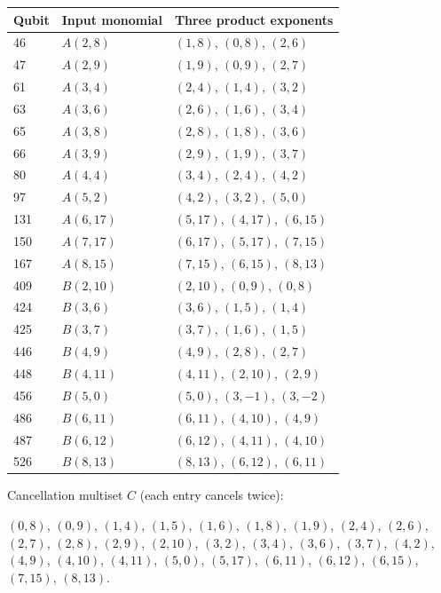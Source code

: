 \documentclass{article}
\begin{document}
\begin{center}
\begin{tabular}{lll}
  Qubit & Input monomial & Three product exponents \\
  \hline
  46 & \(A(2, 8)\) & \((1, 8)\), \((0, 8)\), \((2, 6)\) \\
  47 & \(A(2, 9)\) & \((1, 9)\), \((0, 9)\), \((2, 7)\) \\
  61 & \(A(3, 4)\) & \((2, 4)\), \((1, 4)\), \((3, 2)\) \\
  63 & \(A(3, 6)\) & \((2, 6)\), \((1, 6)\), \((3, 4)\) \\
  65 & \(A(3, 8)\) & \((2, 8)\), \((1, 8)\), \((3, 6)\) \\
  66 & \(A(3, 9)\) & \((2, 9)\), \((1, 9)\), \((3, 7)\) \\
  80 & \(A(4, 4)\) & \((3, 4)\), \((2, 4)\), \((4, 2)\) \\
  97 & \(A(5, 2)\) & \((4, 2)\), \((3, 2)\), \((5, 0)\) \\
  131 & \(A(6, 17)\) & \((5, 17)\), \((4, 17)\), \((6, 15)\) \\
  150 & \(A(7, 17)\) & \((6, 17)\), \((5, 17)\), \((7, 15)\) \\
  167 & \(A(8, 15)\) & \((7, 15)\), \((6, 15)\), \((8, 13)\) \\
  409 & \(B(2, 10)\) & \((2, 10)\), \((0, 9)\), \((0, 8)\) \\
  424 & \(B(3, 6)\) & \((3, 6)\), \((1, 5)\), \((1, 4)\) \\
  425 & \(B(3, 7)\) & \((3, 7)\), \((1, 6)\), \((1, 5)\) \\
  446 & \(B(4, 9)\) & \((4, 9)\), \((2, 8)\), \((2, 7)\) \\
  448 & \(B(4, 11)\) & \((4, 11)\), \((2, 10)\), \((2, 9)\) \\
  456 & \(B(5, 0)\) & \((5, 0)\), \((3, -1)\), \((3, -2)\) \\
  486 & \(B(6, 11)\) & \((6, 11)\), \((4, 10)\), \((4, 9)\) \\
  487 & \(B(6, 12)\) & \((6, 12)\), \((4, 11)\), \((4, 10)\) \\
  526 & \(B(8, 13)\) & \((8, 13)\), \((6, 12)\), \((6, 11)\) \\
\end{tabular}
\end{center}

Cancellation multiset \(C\) (each entry cancels twice):

\((0, 8)\), \((0, 9)\), \((1, 4)\), \((1, 5)\), \((1, 6)\), \((1, 8)\), \((1, 9)\), \((2, 4)\), \((2, 6)\), \((2, 7)\), \((2, 8)\), \((2, 9)\), \((2, 10)\), \((3, 2)\), \((3, 4)\), \((3, 6)\), \((3, 7)\), \((4, 2)\), \((4, 9)\), \((4, 10)\), \((4, 11)\), \((5, 0)\), \((5, 17)\), \((6, 11)\), \((6, 12)\), \((6, 15)\), \((7, 15)\), \((8, 13)\).
\end{document}
